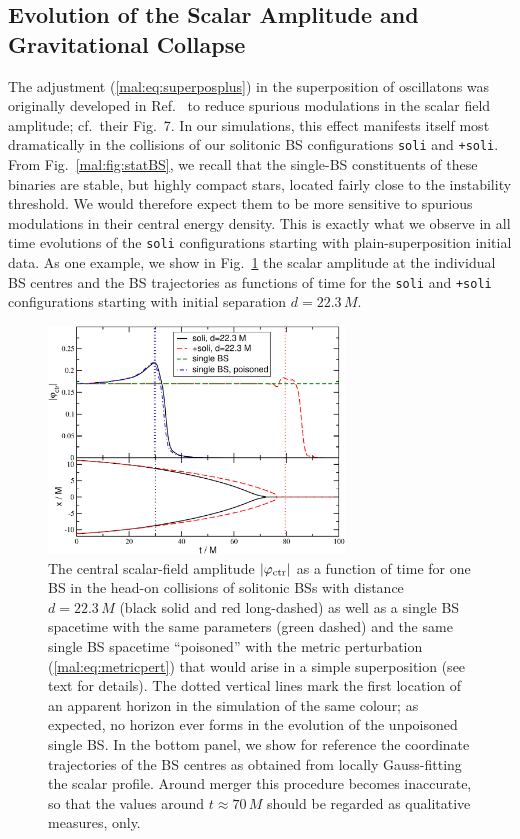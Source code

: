 \subsection{Evolution of the Scalar Amplitude and Gravitational Collapse}
%
The adjustment (\ref{mal:eq:superposplus}) in the superposition of oscillatons
was originally developed in Ref.~\cite{Helfer:2018vtq} to reduce
spurious modulations in the scalar field amplitude; cf.~their
Fig.~7. In our simulations, this effect manifests itself
most dramatically in the collisions of our solitonic BS
configurations {\tt soli} and {\tt +soli}.
From Fig.~\ref{mal:fig:statBS}, we recall that the single-BS constituents
of these binaries are stable, but highly compact stars, located
fairly close to the instability threshold. We would therefore expect
them to be more sensitive to spurious modulations in their central
energy density. This is exactly what we observe in all time evolutions
of the {\tt soli} configurations starting with plain-superposition
initial data. As one example, we show
in Fig.~\ref{mal:fig:soli_ampctr} the scalar amplitude
at the individual BS centres and the BS trajectories
as functions of time for the
{\tt soli} and {\tt +soli} configurations starting with initial
separation $d=22.3\,M$.
%
\begin{figure}
    \centering
    \includegraphics[width=0.7\textwidth]{malaise_source/ampctr_sBS.pdf}
    \caption{The central scalar-field amplitude $|\varphi_{\rm ctr}|$
    as a function of time for one BS in the head-on
    collisions of solitonic BSs with distance $d=22.3\,M$
    (black solid and red long-dashed) as well as a single
    BS spacetime with the same parameters (green dashed)
    and the same single BS spacetime ``poisoned'' with
    the metric perturbation (\ref{mal:eq:metricpert}) that would arise in a simple
    superposition (see text for details). The dotted
    vertical lines mark the first location of an
    apparent horizon in the simulation of the same colour;
    as expected, no horizon ever forms in the evolution
    of the unpoisoned single BS.
    In the bottom panel, we show for reference the coordinate
    trajectories of the BS centres as obtained from locally
    Gauss-fitting the scalar profile. Around merger this procedure
    becomes inaccurate, so that the values around $t\approx 70\,M$
    should be regarded as qualitative measures, only.
    }
    \label{mal:fig:soli_ampctr}
\end{figure}
